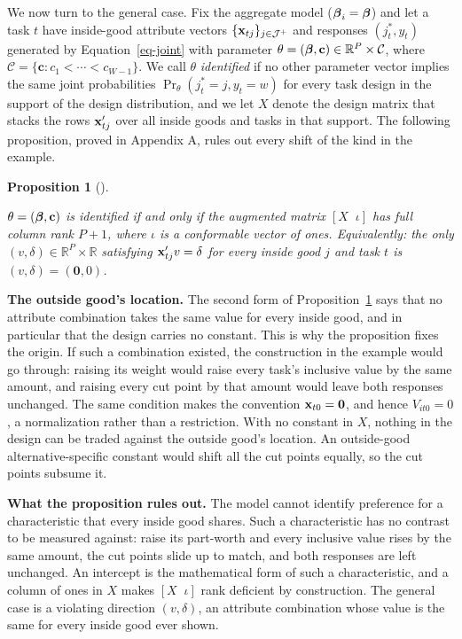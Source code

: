\documentclass[
  letterpaper,
  DIV=11,
  numbers=noendperiod]{scrartcl}
\theoremstyle{plain}
\theoremstyle{plain}
\newtheorem{proposition}{Proposition}[section]
\theoremstyle{plain}
\theoremstyle{remark}
\begin{document}
We now turn to the general case. Fix the aggregate model
(\(\boldsymbol{\beta}_i = \boldsymbol{\beta}\)) and let a task \(t\) have inside-good
attribute vectors \(\lbrace \mathbf{x}_{tj} \rbrace_{j \in \mathcal{J}^+}\) and
responses \(\left( j^*_t, y_t \right)\) generated by
Equation~\ref{eq-joint} with parameter
\(\theta = \left( \boldsymbol{\beta}, \mathbf{c} \right) \in \mathbb{R}^P \times \mathcal{C}\),
where
\(\mathcal{C} = \lbrace \mathbf{c} : c_1 < \cdots < c_{W-1} \rbrace\).
We call \(\theta\) \emph{identified} if no other parameter vector
implies the same joint probabilities
\(\Pr_\theta \left( j^*_t = j, y_t = w \right)\) for every task design
in the support of the design distribution, and we let \(X\) denote the
design matrix that stacks the rows \(\mathbf{x}_{tj}'\) over all inside goods
and tasks in that support. The following proposition, proved in Appendix
A, rules out every shift of the kind in the example.

\begin{proposition}[]\protect\hypertarget{prp-ident}{}\label{prp-ident}

\(\theta = \left( \boldsymbol{\beta}, \mathbf{c} \right)\) is identified if and
only if the augmented matrix \(\left[ X \;\; \iota \right]\) has full
column rank \(P+1\), where \(\iota\) is a conformable vector of ones.
Equivalently: the only
\(\left( v, \delta \right) \in \mathbb{R}^P \times \mathbb{R}\)
satisfying \(\mathbf{x}_{tj}'v = \delta\) for every inside good \(j\) and task
\(t\) is \(\left( v, \delta \right) = \left( \mathbf{0}, 0 \right)\).

\end{proposition}

\textbf{The outside good's location.} The second form of
Proposition~\ref{prp-ident} says that no attribute combination takes the
same value for every inside good, and in particular that the design
carries no constant. This is why the proposition fixes the origin. If
such a combination existed, the construction in the example would go
through: raising its weight would raise every task's inclusive value by
the same amount, and raising every cut point by that amount would leave
both responses unchanged. The same condition makes the convention
\(\mathbf{x}_{t0} = \mathbf{0}\), and hence \(V_{it0} = 0\), a normalization
rather than a restriction. With no constant in \(X\), nothing in the
design can be traded against the outside good's location. An
outside-good alternative-specific constant would shift all the cut
points equally, so the cut points subsume it.

\textbf{What the proposition rules out.} The model cannot identify
preference for a characteristic that every inside good shares. Such a
characteristic has no contrast to be measured against: raise its
part-worth and every inclusive value rises by the same amount, the cut
points slide up to match, and both responses are left unchanged. An
intercept is the mathematical form of such a characteristic, and a
column of ones in \(X\) makes \(\left[ X \;\; \iota \right]\) rank
deficient by construction. The general case is a violating direction
\(\left( v, \delta \right)\), an attribute combination whose value is
the same for every inside good ever shown.
\end{document}
